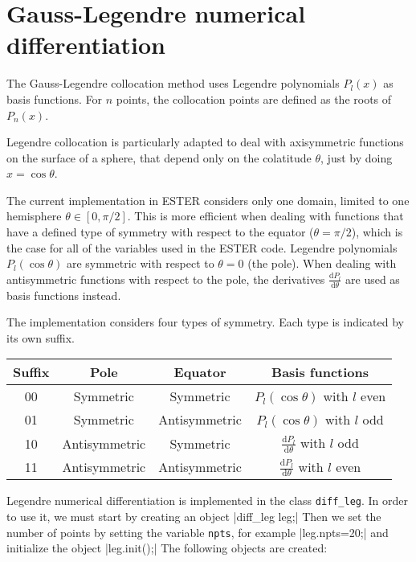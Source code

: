 \section{Gauss-Legendre numerical differentiation}

The Gauss-Legendre collocation method uses Legendre polynomials $P_l(x)$ as basis functions.
For $n$ points, the collocation points are defined as the roots of $P_n(x)$.

Legendre collocation is particularly adapted to deal with axisymmetric functions on the surface
of a sphere, that depend only on the colatitude $\theta$, just by doing $x=\cos\theta$.

The current implementation in ESTER considers only one domain, limited to one hemisphere $\theta\in[0,\pi/2]$.
This is more efficient when dealing with functions that have a defined type of symmetry 
with respect to the equator ($\theta=\pi/2$),
 which is the case for all of the variables used in the ESTER code. 
Legendre polynomials $P_l(\cos\theta)$ are symmetric with respect to $\theta=0$ (the pole). When
dealing with antisymmetric functions with respect to the pole, the derivatives 
$\frac{\mathrm{d}P_l}{\mathrm{d}\theta}$ are used as basis functions instead.

The implementation considers four types of symmetry. Each type is indicated by its own suffix.

\medskip

\begin{tabular}{cccc}
Suffix& Pole &Equator&Basis functions\\
\hline
00&Symmetric&Symmetric&$P_l(\cos\theta)$ with $l$ even \\
01&Symmetric&Antisymmetric&$P_l(\cos\theta)$ with $l$ odd\\
10&Antisymmetric&Symmetric&$\frac{\mathrm{d}P_l}{\mathrm{d}\theta}$ with $l$ odd\\
11&Antisymmetric&Antisymmetric&$\frac{\mathrm{d}P_l}{\mathrm{d}\theta}$ with $l$ even\\
\end{tabular}

\medskip

Legendre numerical differentiation is implemented in the class \texttt{diff\_leg}. In order to use
it, we must start by creating an object
|diff_leg leg;|
Then we set the number of points by setting the variable \texttt{npts}, for example
|leg.npts=20;|
and initialize the object
|leg.init();|
The following objects are created:

